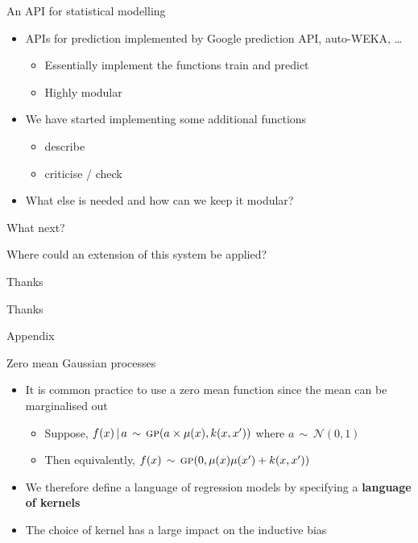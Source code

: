 \begin{frame}{An API for statistical modelling}
  \begin{itemize}
    \item APIs for prediction implemented by \eg  Google prediction API, auto-WEKA, \dots
    \begin{itemize}
      \item Essentially implement the functions train and predict
      \item Highly modular
    \end{itemize}
    \vspace{\baselineskip}
    \item We have started implementing some additional functions
    \begin{itemize}
      \item describe
      \item criticise / check
    \end{itemize}
    \vspace{\baselineskip}
    \item What else is needed and how can we keep it modular?
  \end{itemize}
\end{frame}

\begin{frame}{What next?}
  \begin{center}
  \large
  Where could an extension of this system be applied?
  \end{center}
\end{frame}

\begin{frame}{Thanks}
  \begin{center}
  \Huge
  Thanks
  \end{center}
\end{frame}

\begin{frame}{Appendix}
\end{frame}

\begin{frame}{Zero mean Gaussian processes}
  \begin{itemize}
    \item It is common practice to use a zero mean function since the mean can be marginalised out
  \begin{itemize}
    \item Suppose, ${f(x) \,|\, a \,\sim\, {\textsc{gp}}{}(a \times \mu(x), k(x,x'))}$ where $a \,\sim\, \mathcal{N}(0,1)$
    \item Then equivalently, $f(x) \,\sim\, {\textsc{gp}}{}(0, \mu(x)\mu(x') + k(x,x'))$
  \end{itemize}
  \vspace{\baselineskip}
  \pause
  \item We therefore define a language of \gp{} regression models by
specifying a {\bf language of kernels}
  \vspace{\baselineskip}
  \pause
  \item The choice of kernel has a large impact on the inductive bias
  \end{itemize}
\end{frame}


